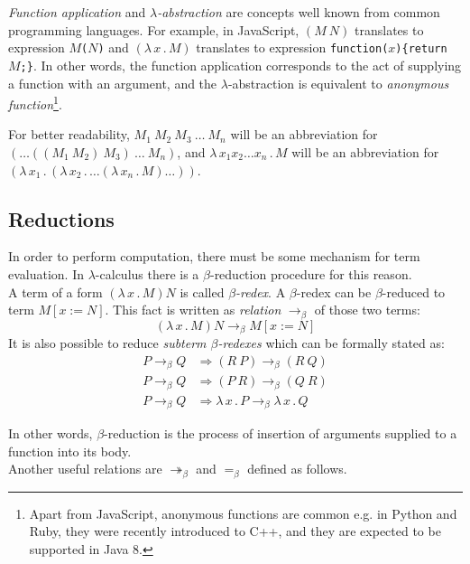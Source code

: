 \documentclass{sig-alternate}
\newcommand{\then}{\Rightarrow\xspace}
\newcommand{\lamb}[2]{( \lambda \, #1 \, . \, #2 )}
\newcommand{\lam}[2]{\lambda \, #1 \, . \, #2}
\newcommand{\bbarr}{\twoheadrightarrow_\beta}
\newcommand{\beq}{=_\beta}
\newcommand{\bRedex}{$\beta$-redex\xspace}
\newcommand{\bRedexes}{$\beta$-redexes\xspace}
\newcommand{\bArrow}{\rightarrow_\beta\xspace}
\begin{document}
\textit{Function application} and 
\textit{$\lambda$-abstraction} are concepts
well known from common programming languages. 
For example, in JavaScript, 
$(M~N)$ translates to expression \texttt{$M$($N$)} and
$\lamb{x}{M}$ translates to expression \texttt{function($x$)\{return $M$;\}}.
In other words, the function application 
corresponds to the act of supplying a function 
with an argument, and
the $\lambda$-abstraction is equivalent to 
\textit{anonymous function}\footnote{Apart from JavaScript, anonymous functions are common e.g. in Python and Ruby, 
they were recently introduced to C++, and they are expected to be supported in Java 8.}.

For better readability, 
$M_1~M_2~M_3~\dots~M_n$ will be an abbreviation for
$(\dots((M_1~M_2)~M_3)~\dots~M_n)$,
and $\lam{x_1 x_2 \dots x_n }{M}$ will be an abbreviation for 
$\lamb{x_1}{\lamb{x_2}{\dots\lamb{x_n}{M}\dots}}$.


\subsection{Reductions}

In order to perform computation, there must be some
mechanism for term evaluation. In $\lambda$-calculus there
is a \mbox{$\beta$-reduction} procedure for this reason.\\

A term of a form $\lamb{x}{M}N$ is called \textit{\bRedex}.
A \bRedex can be $\beta$-reduced to term $M[x:=N]$. 
This fact is written as \textit{relation} $\bArrow$ 
of those two terms:
\begin{equation} \label{eq:bRed}
\lamb{x}{M}N \bArrow M[x:=N]
\end{equation}
It is also possible to reduce \textit{subterm \bRedexes} 
which can be formally stated as:
\begin{align*}
P \bArrow Q &\then (R~P)      \bArrow (R~Q) \\
P \bArrow Q &\then (P~R)      \bArrow (Q~R) \\
P \bArrow Q &\then \lam{x}{P} \bArrow \lam{x}{Q}  
\end{align*}

In other words, $\beta$-reduction is the process 
of insertion of arguments supplied to a function into 
its body. \\

Another useful relations are $\bbarr$ and $\beq$ defined as follows. 
\end{document}
